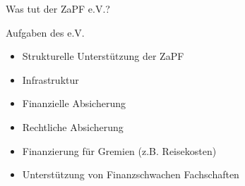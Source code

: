 \documentclass[compress, aspectratio=169]{beamer}
\begin{document}

\begin{frame}{Was tut der ZaPF e.V.?}
  \begin{block}{Aufgaben des e.V.}
    \begin{itemize}
      \item Strukturelle Unterstützung der ZaPF
      \item Infrastruktur
      \item Finanzielle Absicherung
      \item Rechtliche Absicherung
      \item Finanzierung für Gremien (z.B. Reisekosten)
      \item Unterstützung von Finanzschwachen Fachschaften
    \end{itemize}
  \end{block}
\end{frame}
  
\end{document}
